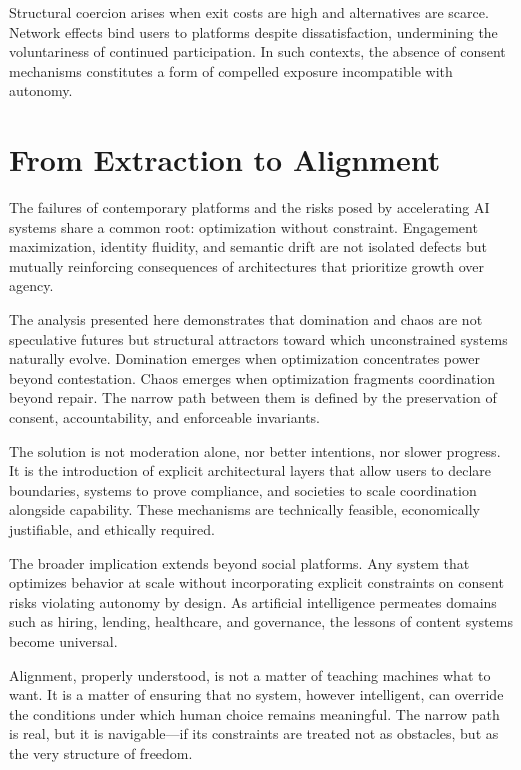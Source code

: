 \documentclass[11pt,oneside]{article}
\begin{document}
Structural coercion arises when exit costs are high and alternatives are scarce. Network effects bind users to platforms despite dissatisfaction, undermining the voluntariness of continued participation. In such contexts, the absence of consent mechanisms constitutes a form of compelled exposure incompatible with autonomy.

\section{From Extraction to Alignment}

The failures of contemporary platforms and the risks posed by accelerating AI systems share a common root: optimization without constraint. Engagement maximization, identity fluidity, and semantic drift are not isolated defects but mutually reinforcing consequences of architectures that prioritize growth over agency.

The analysis presented here demonstrates that domination and chaos are not speculative futures but structural attractors toward which unconstrained systems naturally evolve. Domination emerges when optimization concentrates power beyond contestation. Chaos emerges when optimization fragments coordination beyond repair. The narrow path between them is defined by the preservation of consent, accountability, and enforceable invariants.

The solution is not moderation alone, nor better intentions, nor slower progress. It is the introduction of explicit architectural layers that allow users to declare boundaries, systems to prove compliance, and societies to scale coordination alongside capability. These mechanisms are technically feasible, economically justifiable, and ethically required.

The broader implication extends beyond social platforms. Any system that optimizes behavior at scale without incorporating explicit constraints on consent risks violating autonomy by design. As artificial intelligence permeates domains such as hiring, lending, healthcare, and governance, the lessons of content systems become universal.

Alignment, properly understood, is not a matter of teaching machines what to want. It is a matter of ensuring that no system, however intelligent, can override the conditions under which human choice remains meaningful. The narrow path is real, but it is navigable—if its constraints are treated not as obstacles, but as the very structure of freedom.
\end{document}
